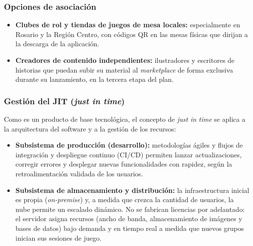 \subsubsection{Opciones de asociación}
\begin{itemize}
  \item \textbf{Clubes de rol y tiendas de juegos de mesa locales:} especialmente en Rosario y la Región Centro, con códigos QR en las mesas físicas que dirijan a la descarga de la aplicación.
  \item \textbf{Creadores de contenido independientes:} ilustradores y escritores de historias que puedan subir su material al \textit{marketplace} de forma exclusiva durante su lanzamiento, en la tercera etapa del plan.
\end{itemize}

\subsubsection{Gestión del JIT (\textit{just in time})}
Como \nombreproyecto{} es un producto de base tecnológica, el concepto de \textit{just in time} se aplica a la arquitectura del software y a la gestión de los recursos:
\begin{itemize}
  \item \textbf{Subsistema de producción (desarrollo):} metodologías ágiles y flujos de integración y despliegue continuo (CI/CD) permiten lanzar actualizaciones, corregir errores y desplegar nuevas funcionalidades con rapidez, según la retroalimentación validada de los usuarios.
  \item \textbf{Subsistema de almacenamiento y distribución:} la infraestructura inicial es propia (\textit{on-premise}) y, a medida que crezca la cantidad de usuarios, la nube permite un escalado dinámico. No se fabrican licencias por adelantado: el servidor asigna recursos (ancho de banda, almacenamiento de imágenes y bases de datos) bajo demanda y en tiempo real a medida que nuevos grupos inician sus sesiones de juego.
\end{itemize}
